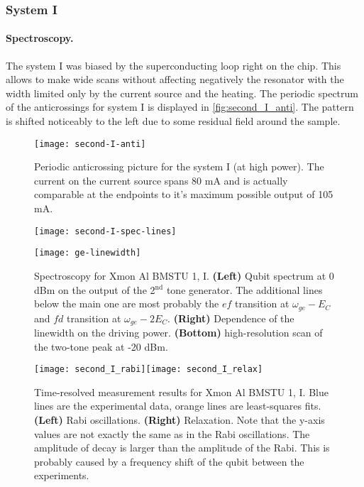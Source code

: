 \documentclass[12pt, twoside]{report}
\numberwithin{equation}{section}
\begin{document}
\subsubsection{System I}

\paragraph{Spectroscopy.} The system I was biased by the superconducting loop right on the chip. This allows to make wide scans without affecting negatively the resonator with the width limited only by the current source and the heating. The periodic spectrum of the anticrossings for system I is displayed in \autoref{fig:second_I_anti}. The pattern is shifted noticeably to the left due to some residual field around the sample.

\begin{figure}[h]
\centering
\texttt{[image: second-I-anti]}
\caption{Periodic anticrossing picture for the system I (at high power). The current on the current source spans 80 mA and is actually comparable at the endpoints to it's maximum possible output of 105 mA.}
\label{fig:second_I_anti}
\end{figure}

\begin{figure}[h]
\centering
\texttt{[image: second-I-spec-lines]}

\texttt{[image: ge-linewidth]}
\caption{Spectroscopy for Xmon Al BMSTU 1, I. \textbf{(Left)} Qubit spectrum at 0 dBm on the output of the 2$^{\text{nd}}$ tone generator. The additional lines below the main one are most probably the $ef$ transition at $\omega_{ge}-E_C$ and $fd$ transition at $\omega_{ge}-2E_C$. \textbf{(Right)} Dependence of the linewidth on the driving power. \textbf{(Bottom)} high-resolution scan of the two-tone peak at -20 dBm.}
\label{fig:second_I_spec_lines}
\end{figure}

\begin{figure}[h!]
\texttt{[image: second\_I\_rabi]}\texttt{[image: second\_I\_relax]} 
\caption{Time-resolved measurement results for Xmon Al BMSTU 1, I. Blue lines are the experimental data, orange lines are least-squares fits. \textbf{(Left)} Rabi oscillations. \textbf{(Right)} Relaxation. Note that the y-axis values are not exactly the same as in the Rabi oscillations. The amplitude of decay is larger than the amplitude of the Rabi. This is probably caused by a frequency shift of the qubit between the experiments.}
\label{fig:second_I_td}
\end{figure}
\end{document}
